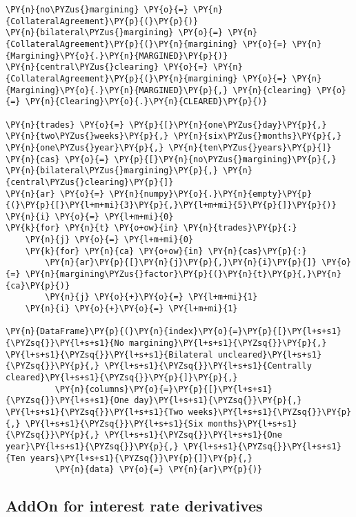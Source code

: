 \begin{tcolorbox}[breakable, size=fbox, boxrule=1pt, pad at break*=1mm,colback=cellbackground, colframe=cellborder]
\begin{Verbatim}[commandchars=\\\{\}]
\PY{n}{no\PYZus{}margining} \PY{o}{=} \PY{n}{CollateralAgreement}\PY{p}{(}\PY{p}{)}
\PY{n}{bilateral\PYZus{}margining} \PY{o}{=} \PY{n}{CollateralAgreement}\PY{p}{(}\PY{n}{margining} \PY{o}{=} \PY{n}{Margining}\PY{o}{.}\PY{n}{MARGINED}\PY{p}{)}
\PY{n}{central\PYZus{}clearing} \PY{o}{=} \PY{n}{CollateralAgreement}\PY{p}{(}\PY{n}{margining} \PY{o}{=} \PY{n}{Margining}\PY{o}{.}\PY{n}{MARGINED}\PY{p}{,} \PY{n}{clearing} \PY{o}{=} \PY{n}{Clearing}\PY{o}{.}\PY{n}{CLEARED}\PY{p}{)}

\PY{n}{trades} \PY{o}{=} \PY{p}{[}\PY{n}{one\PYZus{}day}\PY{p}{,} \PY{n}{two\PYZus{}weeks}\PY{p}{,} \PY{n}{six\PYZus{}months}\PY{p}{,} \PY{n}{one\PYZus{}year}\PY{p}{,} \PY{n}{ten\PYZus{}years}\PY{p}{]}
\PY{n}{cas} \PY{o}{=} \PY{p}{[}\PY{n}{no\PYZus{}margining}\PY{p}{,} \PY{n}{bilateral\PYZus{}margining}\PY{p}{,} \PY{n}{central\PYZus{}clearing}\PY{p}{]}
\PY{n}{ar} \PY{o}{=} \PY{n}{numpy}\PY{o}{.}\PY{n}{empty}\PY{p}{(}\PY{p}{[}\PY{l+m+mi}{3}\PY{p}{,}\PY{l+m+mi}{5}\PY{p}{]}\PY{p}{)}
\PY{n}{i} \PY{o}{=} \PY{l+m+mi}{0}
\PY{k}{for} \PY{n}{t} \PY{o+ow}{in} \PY{n}{trades}\PY{p}{:}
    \PY{n}{j} \PY{o}{=} \PY{l+m+mi}{0}
    \PY{k}{for} \PY{n}{ca} \PY{o+ow}{in} \PY{n}{cas}\PY{p}{:}
        \PY{n}{ar}\PY{p}{[}\PY{n}{j}\PY{p}{,}\PY{n}{i}\PY{p}{]} \PY{o}{=} \PY{n}{margining\PYZus{}factor}\PY{p}{(}\PY{n}{t}\PY{p}{,}\PY{n}{ca}\PY{p}{)}
        \PY{n}{j} \PY{o}{+}\PY{o}{=} \PY{l+m+mi}{1}
    \PY{n}{i} \PY{o}{+}\PY{o}{=} \PY{l+m+mi}{1}

\PY{n}{DataFrame}\PY{p}{(}\PY{n}{index}\PY{o}{=}\PY{p}{[}\PY{l+s+s1}{\PYZsq{}}\PY{l+s+s1}{No margining}\PY{l+s+s1}{\PYZsq{}}\PY{p}{,} \PY{l+s+s1}{\PYZsq{}}\PY{l+s+s1}{Bilateral uncleared}\PY{l+s+s1}{\PYZsq{}}\PY{p}{,} \PY{l+s+s1}{\PYZsq{}}\PY{l+s+s1}{Centrally cleared}\PY{l+s+s1}{\PYZsq{}}\PY{p}{]}\PY{p}{,}
          \PY{n}{columns}\PY{o}{=}\PY{p}{[}\PY{l+s+s1}{\PYZsq{}}\PY{l+s+s1}{One day}\PY{l+s+s1}{\PYZsq{}}\PY{p}{,} \PY{l+s+s1}{\PYZsq{}}\PY{l+s+s1}{Two weeks}\PY{l+s+s1}{\PYZsq{}}\PY{p}{,} \PY{l+s+s1}{\PYZsq{}}\PY{l+s+s1}{Six months}\PY{l+s+s1}{\PYZsq{}}\PY{p}{,} \PY{l+s+s1}{\PYZsq{}}\PY{l+s+s1}{One year}\PY{l+s+s1}{\PYZsq{}}\PY{p}{,} \PY{l+s+s1}{\PYZsq{}}\PY{l+s+s1}{Ten years}\PY{l+s+s1}{\PYZsq{}}\PY{p}{]}\PY{p}{,}
          \PY{n}{data} \PY{o}{=} \PY{n}{ar}\PY{p}{)}
\end{Verbatim}
\end{tcolorbox}

    \hypertarget{addon-for-interest-rate-derivatives}{%
\subsection{AddOn for interest rate
derivatives}\label{addon-for-interest-rate-derivatives}}

